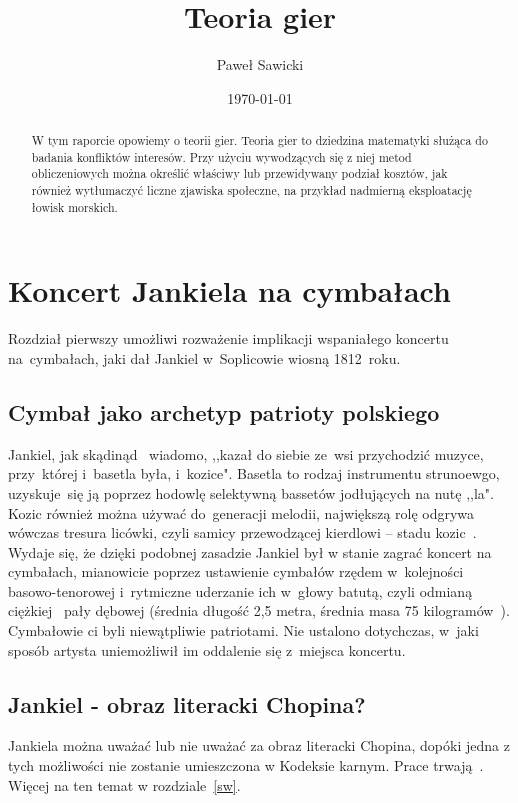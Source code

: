 \documentclass[11pt, onecolumn, twoside]{report}
\title{Teoria gier}
\author{Paweł Sawicki}
\date{\today}
\begin{document}
\pagestyle{fancy}
\fancyfoot[C]{}
\fancyfoot[R]{\thepage}
\fancyhead[L]{}
\fancyhead[R]{}

\begin{titlepage}
\maketitle
\end{titlepage}

\newpage
\begin{abstract}
W tym raporcie opowiemy o teorii gier. Teoria gier to dziedzina matematyki służąca do badania konfliktów interesów. Przy użyciu wywodzących się z niej metod obliczeniowych można określić właściwy lub przewidywany podział kosztów, jak również wytłumaczyć liczne zjawiska społeczne, na przykład nadmierną eksploatację łowisk morskich.
\end{abstract}
\tableofcontents
\newpage
\chapter{Koncert Jankiela na cymbałach}
Rozdział pierwszy umożliwi rozważenie implikacji wspaniałego koncertu na~cymbałach, jaki dał Jankiel w~Soplicowie wiosną 1812~roku.
\newpage
\section{Cymbał jako archetyp patrioty polskiego}
Jankiel, jak skądinąd~\cite{bibosz1} wiadomo, ,,kazał do siebie ze~wsi przychodzić muzyce, przy~której i~basetla była, i~kozice". Basetla to rodzaj instrumentu strunoewgo, uzyskuje~się ją poprzez hodowlę selektywną bassetów jodłujących na nutę ,,la". Kozic również można używać do~generacji melodii, największą rolę odgrywa wówczas tresura licówki, czyli samicy przewodzącej kierdlowi -- stadu kozic~\cite{bibosz3}. Wydaje się, że dzięki podobnej zasadzie Jankiel był w stanie zagrać koncert na cymbałach, mianowicie poprzez ustawienie cymbałów rzędem w~kolejności basowo-tenorowej i~rytmiczne uderzanie ich w~głowy batutą, czyli odmianą ciężkiej~\cite{bibosz2} pały dębowej (średnia długość 2,5 metra, średnia masa 75 kilogramów~\cite{bibosz1}). Cymbałowie ci byli niewątpliwie patriotami. Nie ustalono dotychczas, w~jaki sposób artysta uniemożliwił im oddalenie się z~miejsca koncertu.
\newpage
\section{Jankiel - obraz literacki Chopina?}
Jankiela można uważać lub nie uważać za obraz literacki Chopina, dopóki jedna z tych możliwości nie zostanie umieszczona w Kodeksie karnym. Prace trwają~\cite{bibosz2}. Więcej na ten temat w rozdziale~\ref{sw}.
\newpage
\end{document}
